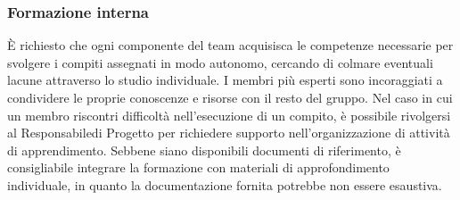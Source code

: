 \subsubsection{Formazione interna}
È richiesto che ogni componente del team acquisisca le competenze necessarie per svolgere i compiti assegnati in modo autonomo, cercando di colmare eventuali lacune attraverso lo studio individuale. I membri più esperti sono incoraggiati a condividere le proprie conoscenze e risorse con il resto del gruppo. Nel caso in cui un membro riscontri difficoltà nell'esecuzione di un compito, è possibile rivolgersi al Responsabile\glo di Progetto per richiedere supporto nell'organizzazione di attività di apprendimento. Sebbene siano disponibili documenti di riferimento, è consigliabile integrare la formazione con materiali di approfondimento individuale, in quanto la documentazione fornita potrebbe non essere esaustiva.

